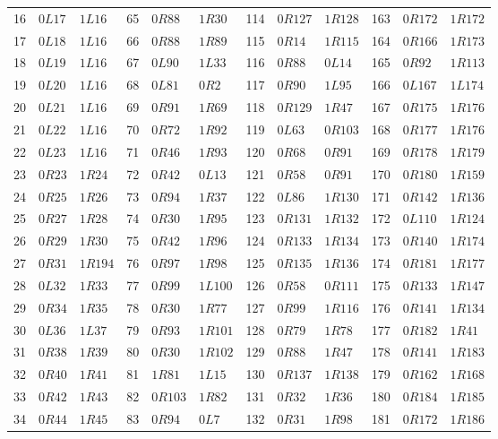 \begin{longtable}{@{}rll@{\quad}rll@{\quad}rll@{\quad}rll@{}}
16 & $0L17$ & $1L16$ & 65 & $0R88$ & $1R30$ & 114 & $0R127$ & $1R128$ & 163 & $0R172$ & $1R172$ \\
17 & $0L18$ & $1L16$ & 66 & $0R88$ & $1R89$ & 115 & $0R14$ & $1R115$ & 164 & $0R166$ & $1R173$ \\
18 & $0L19$ & $1L16$ & 67 & $0L90$ & $1L33$ & 116 & $0R88$ & $0L14$ & 165 & $0R92$ & $1R113$ \\
19 & $0L20$ & $1L16$ & 68 & $0L81$ & $0R2$ & 117 & $0R90$ & $1L95$ & 166 & $0L167$ & $1L174$ \\
20 & $0L21$ & $1L16$ & 69 & $0R91$ & $1R69$ & 118 & $0R129$ & $1R47$ & 167 & $0R175$ & $1R176$ \\
21 & $0L22$ & $1L16$ & 70 & $0R72$ & $1R92$ & 119 & $0L63$ & $0R103$ & 168 & $0R177$ & $1R176$ \\
22 & $0L23$ & $1L16$ & 71 & $0R46$ & $1R93$ & 120 & $0R68$ & $0R91$ & 169 & $0R178$ & $1R179$ \\
23 & $0R23$ & $1R24$ & 72 & $0R42$ & $0L13$ & 121 & $0R58$ & $0R91$ & 170 & $0R180$ & $1R159$ \\
24 & $0R25$ & $1R26$ & 73 & $0R94$ & $1R37$ & 122 & $0L86$ & $1R130$ & 171 & $0R142$ & $1R136$ \\
25 & $0R27$ & $1R28$ & 74 & $0R30$ & $1R95$ & 123 & $0R131$ & $1R132$ & 172 & $0L110$ & $1R124$ \\
26 & $0R29$ & $1R30$ & 75 & $0R42$ & $1R96$ & 124 & $0R133$ & $1R134$ & 173 & $0R140$ & $1R174$ \\
27 & $0R31$ & $1R194$ & 76 & $0R97$ & $1R98$ & 125 & $0R135$ & $1R136$ & 174 & $0R181$ & $1R177$ \\
28 & $0L32$ & $1R33$ & 77 & $0R99$ & $1L100$ & 126 & $0R58$ & $0R111$ & 175 & $0R133$ & $1R147$ \\
29 & $0R34$ & $1R35$ & 78 & $0R30$ & $1R77$ & 127 & $0R99$ & $1R116$ & 176 & $0R141$ & $1R134$ \\
30 & $0L36$ & $1L37$ & 79 & $0R93$ & $1R101$ & 128 & $0R79$ & $1R78$ & 177 & $0R182$ & $1R41$ \\
31 & $0R38$ & $1R39$ & 80 & $0R30$ & $1R102$ & 129 & $0R88$ & $1R47$ & 178 & $0R141$ & $1R183$ \\
32 & $0R40$ & $1R41$ & 81 & $1R81$ & $1L15$ & 130 & $0R137$ & $1R138$ & 179 & $0R162$ & $1R168$ \\
33 & $0R42$ & $1R43$ & 82 & $0R103$ & $1R82$ & 131 & $0R32$ & $1R36$ & 180 & $0R184$ & $1R185$ \\
34 & $0R44$ & $1R45$ & 83 & $0R94$ & $0L7$ & 132 & $0R31$ & $1R98$ & 181 & $0R172$ & $1R186$ \\

\end{longtable}
